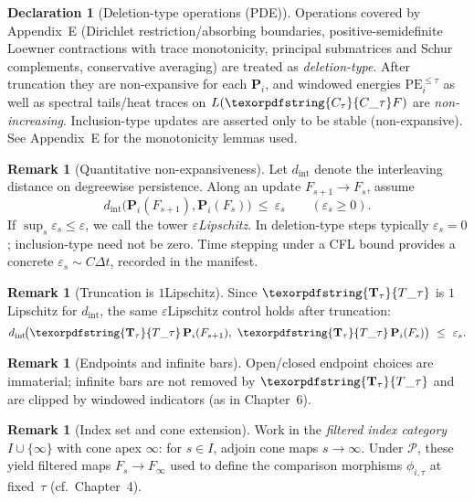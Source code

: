 \documentclass[11pt]{article}
\DeclareRobustCommand{\hyp}{\nobreakdash-}
\numberwithin{equation}{section}
\theoremstyle{definition}
\newtheorem{remark}[theorem]{Remark}
\newtheorem{declaration}[theorem]{Declaration}
\DeclareRobustCommand{\Ttau}{\texorpdfstring{\ensuremath{\mathbf{T}_{\tau}}}{T\_\tau}}
\DeclareRobustCommand{\Ctau}{\texorpdfstring{\ensuremath{C_{\tau}}}{C\_\tau}}
\begin{document}
\begin{declaration}[Deletion\hyp type operations (PDE)]\label{spec:10-pde-del}
Operations covered by Appendix~E (Dirichlet restriction/absorbing boundaries, positive\hyp semidefinite Loewner contractions with trace monotonicity, principal submatrices and Schur complements, conservative averaging) are treated as \emph{deletion\hyp type}.
After truncation they are non\hyp expansive for each \(\mathbf{P}_i\), and windowed energies \(\mathrm{PE}_i^{\le\tau}\) as well as spectral tails/heat traces on \(L(\Ctau F)\) are \emph{non\hyp increasing}.
Inclusion\hyp type updates are asserted only to be stable (non\hyp expansive). See Appendix~E for the monotonicity lemmas used.
\end{declaration}

\begin{remark}[Quantitative non\hyp expansiveness]\label{rk:10-epsilon}
Let \(d_{\mathrm{int}}\) denote the interleaving distance on degreewise persistence. Along an update \(F_{s+1}\to F_s\), assume
\[
  d_{\mathrm{int}}\big(\mathbf{P}_i(F_{s+1}),\mathbf{P}_i(F_s)\big)\ \le\ \varepsilon_s\qquad(\varepsilon_s\ge 0).
\]
If \(\sup_s\varepsilon_s\le \varepsilon\), we call the tower \emph{\(\varepsilon\)\nobreakdash Lipschitz}. In deletion\hyp type steps typically \(\varepsilon_s=0\); inclusion\hyp type need not be zero. Time stepping under a CFL bound provides a concrete \(\varepsilon_s\sim C\Delta t\), recorded in the manifest.
\end{remark}

\begin{remark}[Truncation is \(1\)\nobreakdash Lipschitz]
Since \(\Ttau\) is \(1\)\nobreakdash Lipschitz for \(d_{\mathrm{int}}\), the same \(\varepsilon\)\nobreakdash Lipschitz control holds after truncation:
\[
d_{\mathrm{int}}\!\big(\Ttau\,\mathbf{P}_i(F_{s+1}),\ \Ttau\,\mathbf{P}_i(F_s)\big)\ \le\ \varepsilon_s.
\]
\end{remark}

\begin{remark}[Endpoints and infinite bars]\label{rk:10-endpoints}
Open/closed endpoint choices are immaterial; infinite bars are not removed by \(\Ttau\) and are clipped by windowed indicators (as in Chapter~6).
\end{remark}

\begin{remark}[Index set and cone extension]\label{rk:10-cone}
Work in the \emph{filtered index category} \(I\cup\{\infty\}\) with cone apex \(\infty\): for \(s\in I\), adjoin cone maps \(s\to\infty\).
Under \(\mathcal{P}\), these yield filtered maps \(F_s\to F_\infty\) used to define the comparison morphisms \(\phi_{i,\tau}\) at fixed~\(\tau\) (cf.\ Chapter~4).
\end{remark}
\end{document}
